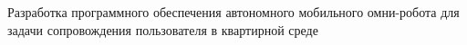 Разработка программного обеспечения автономного мобильного омни-робота для задачи сопровождения пользователя в квартирной среде
